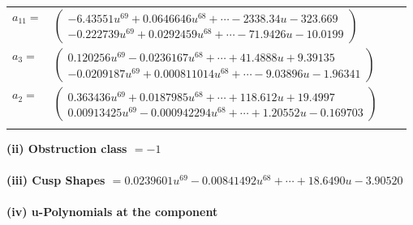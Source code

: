\documentclass[1p]{elsarticle_modified}
\theoremstyle{definition}
\begin{document}
\begin{tabular}{m{7pt} m{180pt} m{7pt} m{180pt} }
\flushright $a_{11}=$&$\begin{pmatrix}-6.43551 u^{69}+0.0646646 u^{68}+\cdots-2338.34 u-323.669\\-0.222739 u^{69}+0.0292459 u^{68}+\cdots-71.9426 u-10.0199\end{pmatrix}$ \\
\flushright $a_{3}=$&$\begin{pmatrix}0.120256 u^{69}-0.0236167 u^{68}+\cdots+41.4888 u+9.39135\\-0.0209187 u^{69}+0.000811014 u^{68}+\cdots-9.03896 u-1.96341\end{pmatrix}$ \\
\flushright $a_{2}=$&$\begin{pmatrix}0.363436 u^{69}+0.0187985 u^{68}+\cdots+118.612 u+19.4997\\0.00913425 u^{69}-0.000942294 u^{68}+\cdots+1.20552 u-0.169703\end{pmatrix}$\\&\end{tabular}
\flushleft \textbf{(ii) Obstruction class $= -1$}\\~\\
\flushleft \textbf{(iii) Cusp Shapes $= 0.0239601 u^{69}-0.00841492 u^{68}+\cdots+18.6490 u-3.90520$}\\~\\
\newpage\renewcommand{\arraystretch}{1}
\flushleft \textbf{(iv) u-Polynomials at the component}\newline \\
\end{document}
